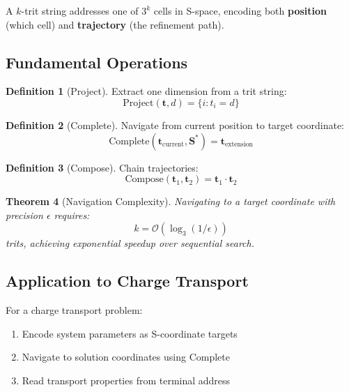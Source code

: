 \documentclass[twocolumn,10pt]{article}
\newtheorem{theorem}{Theorem}[section]
\theoremstyle{definition}
\newtheorem{definition}[theorem]{Definition}
\theoremstyle{remark}
\newcommand{\Scoord}{\mathbf{S}}
\newcommand{\bigO}{\mathcal{O}}
\begin{document}
A $k$-trit string addresses one of $3^k$ cells in S-space, encoding both \textbf{position} (which cell) and \textbf{trajectory} (the refinement path).

\subsection{Fundamental Operations}

\begin{definition}[Project]
Extract one dimension from a trit string:
\begin{equation}
\text{Project}(\mathbf{t}, d) = \{i : t_i = d\}
\end{equation}
\end{definition}

\begin{definition}[Complete]
Navigate from current position to target coordinate:
\begin{equation}
\text{Complete}(\mathbf{t}_{\text{current}}, \Scoord^*) = \mathbf{t}_{\text{extension}}
\end{equation}
\end{definition}

\begin{definition}[Compose]
Chain trajectories:
\begin{equation}
\text{Compose}(\mathbf{t}_1, \mathbf{t}_2) = \mathbf{t}_1 \cdot \mathbf{t}_2
\end{equation}
\end{definition}

\begin{theorem}[Navigation Complexity]
\label{thm:navigation}
Navigating to a target coordinate with precision $\epsilon$ requires:
\begin{equation}
k = \bigO(\log_3(1/\epsilon))
\end{equation}
trits, achieving exponential speedup over sequential search.
\end{theorem}



\subsection{Application to Charge Transport}

For a charge transport problem:
\begin{enumerate}
    \item Encode system parameters as S-coordinate targets
    \item Navigate to solution coordinates using Complete
    \item Read transport properties from terminal address
\end{enumerate}
\end{document}
